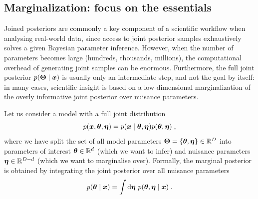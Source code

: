 

\subsection{Marginalization: focus on the essentials} \label{subsec:tmnre-m} %

Joined posteriors are commonly a key component of a scientific workflow when analysing real-world data, since access to joint posterior samples exhaustively solves a given Bayesian parameter inference. However, when the number of parameters becomes large (hundreds, thousands, millions), the computational overhead of generating joint samples can be enormous. Furthermore, the full joint posterior $p(\bm{\Theta} \mid \bm{x})$ is usually only an intermediate step, and not the goal by itself: in many cases, scientific insight is based on a low-dimensional marginalization of the overly informative joint posterior over nuisance parameters.

Let us consider a model with a full joint distribution
\begin{equation}
	p(\bm{x},\bm{\theta}, \bm{\eta}) = p(\bm{x}\mid\bm{\theta}, \bm{\eta})p(\bm{\theta}, \bm{\eta}) \;,
\end{equation} 
where we have split the set of all model parameters $\bm{\Theta} = \{\bm{\theta},\bm{\eta}\} \in \mathbb{R}^D$ into parameters of interest $\bm{\theta} \in \mathbb{R}^d$ (which we want to infer) and nuisance parameters $\bm{\eta} \in \mathbb{R}^{D-d}$ (which we want to marginalise over). 
Formally, the marginal posterior is obtained by integrating the joint posterior over all nuisance parameters
\begin{equation}
	p(\interest \mid \data) = \int \dd\nuisance\ p(\interest, \nuisance \mid \data) \;.
\end{equation}


